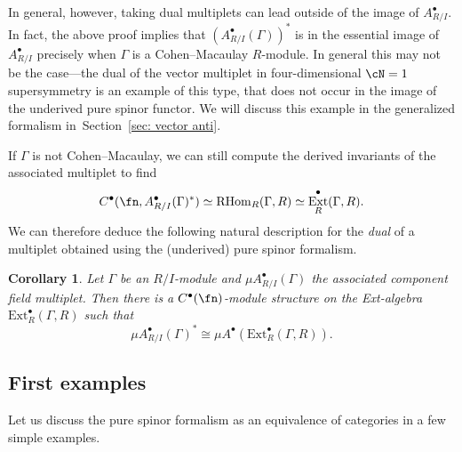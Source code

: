 \documentclass[10pt,a4paper]{amsart}
\numberwithin{equation}{section}
\newtheorem{cor}[thm]{Corollary}
\def\bu{\bullet}
\DeclareMathOperator{\Ext}{Ext}
\begin{document}
In general, however, taking dual multiplets can lead outside of the image of $A^\bullet_{R/I}$. In fact, the above proof implies that $(A^\bullet_{R/I}(\Gamma))^*$ is in the essential image of $A^\bullet_{R/I}$ precisely when $\Gamma$ is a Cohen--Macaulay $R$-module. In general this may not be the case---the dual of the vector multiplet in four-dimensional $\cN=1$ supersymmetry is an example of this type, that does not occur in the image of the underived pure spinor functor. We will discuss this example in the generalized formalism in~Section~\ref{sec: vector anti}.

If $\Gamma$ is not Cohen--Macaulay, we can still compute the derived invariants of the associated multiplet to find
\begin{equation*}
C^\bullet(\fn, A^\bullet_{R/I}(\Gamma)^*) \simeq \mathrm{RHom}_R(\Gamma , R) \simeq \Ext^\bullet_R(\Gamma, R) .
\end{equation*}
We can therefore deduce the following natural description for the \emph{dual} of a multiplet obtained using the (underived) pure spinor formalism.

\begin{cor}
	Let $\Gamma$ be an $R/I$-module and $\mu A_{R/I}^\bu(\Gamma)$ the associated component field multiplet. Then there is a $C^\bullet(\fn)$-module structure on the Ext-algebra $\mathrm{Ext}^\bullet_R(\Gamma , R)$ such that
	\begin{equation*}
	\mu A_{R/I}^\bu(\Gamma)^* \cong \mu A^\bu(\mathrm{Ext}^\bullet_R(\Gamma , R)) .
	\end{equation*}
\end{cor}

\subsection{First examples}

Let us discuss the pure spinor formalism as an equivalence of categories in a few simple examples.
\end{document}
